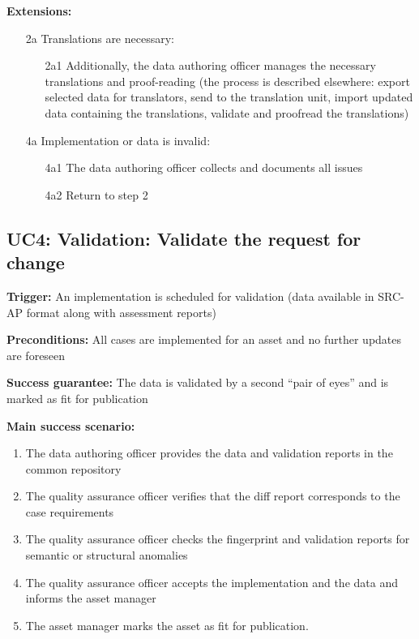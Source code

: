 	\textbf{Extensions:}
	\begin{enumerate}
		\item [2a] Translations are necessary:
		\begin{enumerate}
			\item [2a1] Additionally, the data authoring officer manages the necessary translations and proof-reading (the process is described elsewhere: export selected data for translators, send to the translation unit, import updated data containing the translations, validate and proofread the translations)			
		\end{enumerate}
		\item [4a] Implementation or data is invalid:
		\begin{enumerate}
			\item [4a1] The data authoring officer collects and documents all issues 
			\item [4a2] Return to step 2			
		\end{enumerate}
	\end{enumerate}
	
	\subsection{UC4: Validation: Validate the request for change}
	\label{sec:uc4}
	
	\textbf{Trigger:} An implementation is scheduled for validation (data available in SRC-AP \citep{src-ap-vb3} format along with assessment reports)
	
	\textbf{Preconditions:} All cases are implemented for an asset and no further updates are foreseen
	
	\textbf{Success guarantee:} The data is validated by a second ``pair of eyes'' and is marked as fit for publication
	
	\textbf{Main success scenario:} 
	
	\begin{enumerate}
		\item The data authoring officer provides the data and validation reports in the common repository 
		\item The quality assurance officer verifies that the diff report corresponds to the case requirements
		\item The quality assurance officer checks the fingerprint and validation reports for semantic or structural anomalies
		\item The quality assurance officer accepts the implementation and the data and informs the asset manager
		\item The asset manager marks the asset as fit for publication.
		
	\end{enumerate}
	
